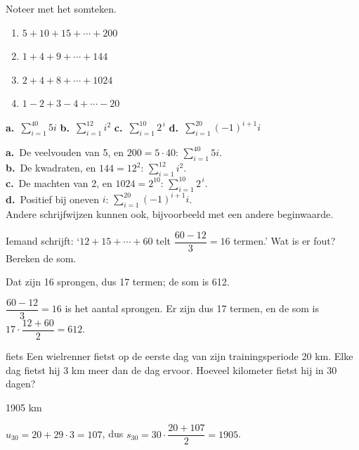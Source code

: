 \begin{oefeningen}
\begin{oefening}[1]\label{oef:h3-noteer}
Noteer met het somteken.
\begin{enumerate}
  \item $5 + 10 + 15 + \cdots + 200$
  \item $1 + 4 + 9 + \cdots + 144$
  \item $2 + 4 + 8 + \cdots + 1024$
  \item $1 - 2 + 3 - 4 + \cdots - 20$
\end{enumerate}
\begin{solution}
\textbf{a.}~$\displaystyle\sum_{i=1}^{40} 5i$ \quad \textbf{b.}~$\displaystyle\sum_{i=1}^{12} i^2$ \quad \textbf{c.}~$\displaystyle\sum_{i=1}^{10} 2^{\,i}$ \quad \textbf{d.}~$\displaystyle\sum_{i=1}^{20} (-1)^{i+1} i$
\end{solution}
\begin{fullsolution}
\textbf{a.}~De veelvouden van 5, en $200=5\cdot 40$: $\displaystyle\sum_{i=1}^{40} 5i$.\\
\textbf{b.}~De kwadraten, en $144=12^2$: $\displaystyle\sum_{i=1}^{12} i^2$.\\
\textbf{c.}~De machten van 2, en $1024=2^{10}$: $\displaystyle\sum_{i=1}^{10} 2^{\,i}$.\\
\textbf{d.}~Positief bij oneven $i$: $\displaystyle\sum_{i=1}^{20} (-1)^{i+1} i$.\\
Andere schrijfwijzen kunnen ook, bijvoorbeeld met een andere beginwaarde.
\end{fullsolution}
\end{oefening}

\begin{oefening}[1]
Iemand schrijft: `$12 + 15 + \cdots + 60$ telt $\dfrac{60 - 12}{3} = 16$ termen.' Wat is er fout? Bereken de som.
\begin{solution}
Dat zijn 16 sprongen, dus 17 termen; de som is 612.
\end{solution}
\begin{fullsolution}
$\dfrac{60-12}{3}=16$ is het aantal sprongen. Er zijn dus 17 termen, en de som is $17\cdot\dfrac{12+60}{2}=612$.
\end{fullsolution}
\end{oefening}

\begin{oefening}[1]
\begin{metprent}{fiets}
Een wielrenner fietst op de eerste dag van zijn trainingsperiode 20 km. Elke dag fietst hij 3 km meer dan de dag ervoor. Hoeveel kilometer fietst hij in 30 dagen?
\end{metprent}
\begin{solution}
1905 km
\end{solution}
\begin{fullsolution}
$u_{30}=20+29\cdot 3=107$, dus $s_{30}=30\cdot\dfrac{20+107}{2}=1905$.
\end{fullsolution}
\end{oefening}


\end{oefeningen}
